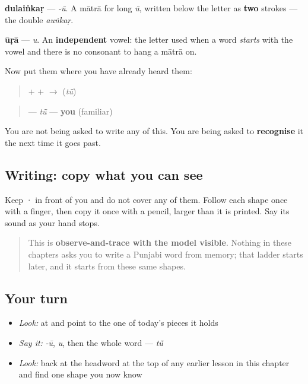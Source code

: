\textbf{dulaiṅkaṛ} — \emph{-ū}. A mātrā for long \emph{ū}, written below the letter as \textbf{two} strokes — the double \emph{auṅkaṛ}.

\begin{quote}
\end{quote}

\textbf{ūṛā} — \emph{u}. An \textbf{independent} vowel: the letter used when a word \emph{starts} with the vowel and there is no consonant to hang a mātrā on.

Now put them where you have already heard them:

\begin{quote}
\textbf{} + \textbf{} + \textbf{} $\to$ \textbf{} (\emph{tū̃})
\end{quote}

\begin{quote}
\textbf{} — \emph{tū̃} — \textbf{you} (familiar)
\end{quote}

You are not being asked to write any of this. You are being asked to \textbf{recognise} it the next time it goes past.

\subsection*{Writing: copy what you can see}
Keep  ·  in front of you and do not cover any of them. Follow each shape once with a finger, then copy it once with a pencil, larger than it is printed. Say its sound as your hand stops.

\begin{quote}
This is \textbf{observe-and-trace with the model visible}. Nothing in these chapters asks you to write a Punjabi word from memory; that ladder starts later, and it starts from these same shapes.
\end{quote}

\subsection*{Your turn}
\begin{itemize}
\raggedright
  \item \emph{Look:} at \textbf{} and point to the one of today's pieces it holds
  \item \emph{Say it:} \emph{-ū}, \emph{u}, then the whole word — \emph{tū̃}
  \item \emph{Look:} back at the headword at the top of any earlier lesson in this chapter and find one shape you now know
\end{itemize}

